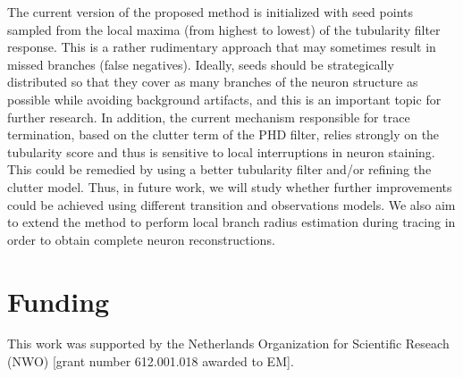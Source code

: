 The current version of the proposed method is initialized with seed points sampled from the local maxima (from highest to lowest) of the tubularity filter response. This is a rather rudimentary approach that may sometimes result in missed branches (false negatives). Ideally, seeds should be strategically distributed so that they cover as many branches of the neuron structure as possible while avoiding background artifacts, and this is an important topic for further research. In addition, the current mechanism responsible for trace termination, based on the clutter term of the PHD filter, relies strongly on the tubularity score and thus is sensitive to local interruptions in neuron staining. This could be remedied by using a better tubularity filter and/or refining the clutter model. Thus, in future work, we will study whether further improvements could be achieved using different transition and observations models. We also aim to extend the method to perform local branch radius estimation during tracing in order to obtain complete neuron reconstructions.

\section*{Funding}
This work was supported by the Netherlands Organization for Scientific Reseach (NWO) [grant number 612.001.018 awarded to EM].




